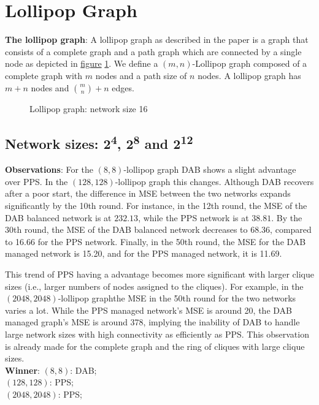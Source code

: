 \section{Lollipop Graph}
\textbf{The lollipop graph}: A lollipop graph as described in the paper \cite{JonassonLollipopGraphs2000} is a graph that consists of a complete graph and a path graph which are connected by a single node as depicted in \hyperref[fig:lollipopgraphDemo]{figure} \ref{fig:lollipopgraphDemo}. We define a $(m, n)$-Lollipop graph composed of a complete graph with $m$ nodes and a path size of $n$ nodes. A lollipop graph has $m+n$ nodes and $\binom{m}{n}+n$ edges.
\begin{figure}[H]
    \centering
    \scalebox{1}{}
    \caption{Lollipop graph: network size 16}
    \label{fig:lollipopgraphDemo}
\end{figure}

\subsection{Network sizes: 2\textsuperscript{4}, 2\textsuperscript{8} and 2\textsuperscript{12}}
\textbf{Observations}: For the $(8, 8)$-lollipop graph DAB shows a slight advantage over PPS. In the $(128, 128)$-lollipop graph this changes. Although DAB recovers after a poor start, the difference in MSE between the two networks expands significantly by the 10th round. For instance, in the 12th round, the MSE of the DAB balanced network is at $232.13$, while the PPS network is at $38.81$. By the 30th round, the MSE of the DAB balanced network decreases to 68.36, compared to 16.66 for the PPS network. Finally, in the 50th round, the MSE for the DAB managed network is 15.20, and for the PPS managed network, it is 11.69.

This trend of PPS having a advantage becomes more significant with larger clique sizes (i.e., larger numbers of nodes assigned to the cliques). For example, in the $(2048, 2048)$-lollipop graphthe MSE in the 50th round for the two networks varies a lot. While the PPS managed network's MSE is around 20, the DAB managed graph's MSE is around 378, implying the inability of DAB to handle large network sizes with high connectivity as efficiently as PPS. This observation is already made for the complete graph and the ring of cliques with large clique sizes. \\
\textbf{Winner}: $(8, 8)$: DAB; \\
$(128, 128)$: PPS; \\
$(2048, 2048)$: PPS;

